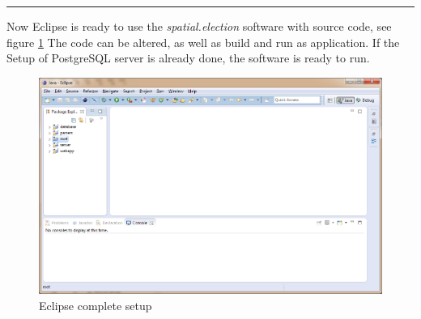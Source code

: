 \begin{center}\rule{3in}{0.4pt}\end{center}

Now Eclipse is ready to use the
\emph{spatial.election} software with source code, see figure \ref{eclipse05}
The code can be altered, as well as build and run as application. If the Setup
of PostgreSQL server is already done, the software is ready to run.

\begin{figure}[htbp]
\centering
\includegraphics[width=1.1\textwidth]{../img/EeGnXjg.png}
\caption{Eclipse complete setup}
\label{eclipse05}
\end{figure}